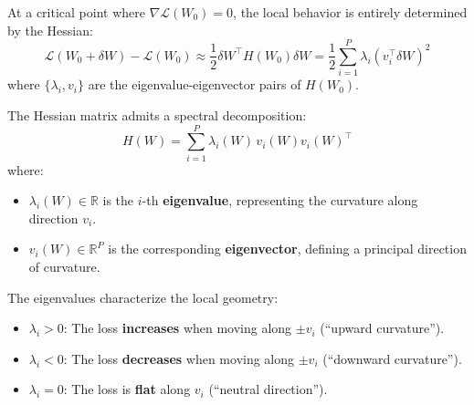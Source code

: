 \documentclass[
  journal=largetwo,
  year=2025,
  volume=37,
]{cup-journal}
\begin{document}
At a critical point where $\nabla \mathcal{L}(W_0) = 0$, the local behavior is entirely determined by the Hessian:
\begin{equation}
    \mathcal{L}(W_0 + \delta W) - \mathcal{L}(W_0) \approx \frac{1}{2} \delta W^\top H(W_0) \delta W = \frac{1}{2} \sum_{i=1}^{P} \lambda_i (v_i^\top \delta W)^2
\end{equation}
where $\{\lambda_i, v_i\}$ are the eigenvalue-eigenvector pairs of $H(W_0)$.

\begin{definition}\label{def:hessian_eigen}
The Hessian matrix admits a spectral decomposition:
\begin{equation}
    H(W) = \sum_{i=1}^{P} \lambda_i(W) \, v_i(W) v_i(W)^\top
\end{equation}
where:
\begin{itemize}
    \item $\lambda_i(W) \in \mathbb{R}$ is the $i$-th \textbf{eigenvalue}, representing the curvature along direction $v_i$.
    \item $v_i(W) \in \mathbb{R}^P$ is the corresponding \textbf{eigenvector}, defining a principal direction of curvature.
\end{itemize}

The eigenvalues characterize the local geometry:
\begin{itemize}
    \item $\lambda_i > 0$: The loss \textbf{increases} when moving along $\pm v_i$ (``upward curvature'').
    \item $\lambda_i < 0$: The loss \textbf{decreases} when moving along $\pm v_i$ (``downward curvature'').
    \item $\lambda_i = 0$: The loss is \textbf{flat} along $v_i$ (``neutral direction'').
\end{itemize}
\end{definition}
\end{document}
